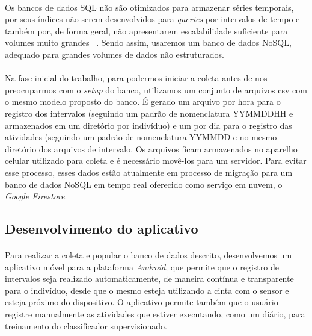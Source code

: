             \paragraph{} Os bancos de dados SQL não são otimizados para armazenar séries temporais, por seus índices não serem desenvolvidos para \textit{queries} por intervalos de tempo e também por, de forma geral, não apresentarem escalabilidade suficiente para volumes muito grandes ~\cite{Dunning2014TimeData}. Sendo assim, usaremos um banco de dados NoSQL, adequado para grandes volumes de dados não estruturados.
            
            \paragraph{} Na fase inicial do trabalho, para podermos iniciar a coleta antes de nos preocuparmos com o \textit{setup} do banco, utilizamos um conjunto de arquivos csv com o mesmo modelo proposto do banco. É gerado um arquivo por hora para o registro dos intervalos (seguindo um padrão de nomenclatura YYMMDDHH e armazenados em um diretório por indivíduo) e um por dia para o registro das atividades (seguindo um padrão de nomenclatura YYMMDD e no mesmo diretório dos arquivos de intervalo. Os arquivos ficam armazenados no aparelho celular utilizado para coleta e é necessário movê-los para um servidor. Para evitar esse processo, esses dados estão atualmente em processo de migração para um banco de dados NoSQL em tempo real oferecido como serviço em nuvem, o \textit{Google Firestore}. 
        
        
        \subsection{Desenvolvimento do aplicativo}
 	
            \paragraph{} Para realizar a coleta e popular o banco de dados descrito, desenvolvemos um aplicativo móvel para a plataforma \textit{Android}, que permite que o registro de intervalos seja realizado automaticamente, de maneira contínua e transparente para o indivíduo, desde que o mesmo esteja utilizando a cinta com o sensor e esteja próximo do dispositivo. O aplicativo permite também que o usuário registre manualmente as atividades que estiver executando, como um diário, para treinamento do classificador supervisionado.
        
